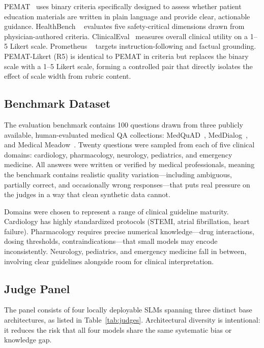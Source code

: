 \documentclass[conference]{IEEEtran}
\begin{document}
PEMAT~\cite{shoemaker2014development} uses binary criteria specifically
designed to assess whether patient education materials are written in
plain language and provide clear, actionable guidance. HealthBench
~\cite{arora2025healthbench} evaluates five safety-critical dimensions
drawn from physician-authored criteria. ClinicalEval~\cite{ho2024qualitative}
measures overall clinical utility on a 1--5 Likert scale. Prometheus
~\cite{kim2024prometheus} targets instruction-following and factual
grounding. PEMAT-Likert (R5) is identical to PEMAT in criteria but
replaces the binary scale with a 1--5 Likert scale, forming a controlled
pair that directly isolates the effect of scale width from rubric content.

\subsection{Benchmark Dataset}

The evaluation benchmark contains 100 questions drawn from three
publicly available, human-evaluated medical QA collections:
MedQuAD~\cite{ben-abacha-medquad-2019}, MedDialog~\cite{chen-meddialog-2020},
and Medical Meadow~\cite{singhal-medical-meadow-2023}. Twenty questions
were sampled from each of five clinical domains: cardiology, pharmacology,
neurology, pediatrics, and emergency medicine. All answers were written
or verified by medical professionals, meaning the benchmark contains
realistic quality variation---including ambiguous, partially correct,
and occasionally wrong responses---that puts real pressure on the judges
in a way that clean synthetic data cannot.

Domains were chosen to represent a range of clinical guideline maturity.
Cardiology has highly standardized protocols (STEMI, atrial fibrillation,
heart failure). Pharmacology requires precise numerical knowledge---drug
interactions, dosing thresholds, contraindications---that small models
may encode inconsistently. Neurology, pediatrics, and emergency medicine
fall in between, involving clear guidelines alongside room for clinical
interpretation.

\subsection{Judge Panel}

The panel consists of four locally deployable SLMs spanning three
distinct base architectures, as listed in Table~\ref{tab:judges}.
Architectural diversity is intentional: it reduces the risk that all
four models share the same systematic bias or knowledge gap.
\end{document}
